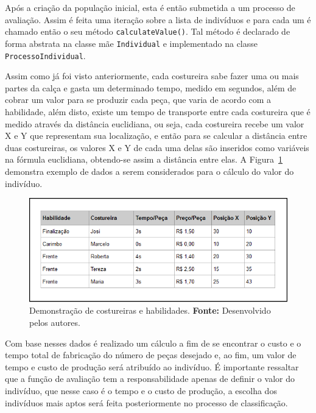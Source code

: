 \par Após a criação da população inicial, esta é então submetida a um processo
de avaliação. Assim é feita uma iteração sobre a lista de indivíduos e para cada um é chamado então o seu método 
\texttt{calculateValue()}. Tal método é declarado de forma abstrata na classe mãe
\texttt{Individual} e implementado na classe \texttt{ProcessoIndividual}.

\par Assim como já foi visto anteriormente, cada costureira sabe fazer uma ou
mais partes da calça e gasta um determinado tempo, medido em segundos, além de cobrar um valor 
para se produzir cada peça, que varia de  acordo com a habilidade, além disto, existe um 
tempo de transporte entre cada costureira que é medido através da distância euclidiana, 
ou seja, cada costureira recebe um valor X e Y que representam sua localização, e então 
para se calcular a distância entre duas costureiras, os valores X e Y de cada uma delas
são inseridos como variáveis na fórmula euclidiana, obtendo-se assim
a distância entre elas. A Figura~\ref{fig:demonstracao_costureiras_habilidades} demonstra 
exemplo de dados a serem considerados para o cálculo do valor do indivíduo.


\begin{figure}[h!]
	\centerline{\includegraphics[scale=0.5]{./imagens/tempo_habilidade_3.PNG}}
	\caption[Demonstração de costureiras e habilidades.]
	{Demonstração de costureiras e habilidades. \textbf{Fonte:} Desenvolvido pelos
	autores.}
	\label{fig:demonstracao_costureiras_habilidades}
\end{figure}

\par Com base nesses dados é realizado um cálculo a fim de se encontrar o custo e o tempo total de fabricação do número de peças
desejado e, ao fim, um valor de tempo e custo de produção será atribuído ao indivíduo. É importante ressaltar que a função de avaliação tem a responsabilidade apenas de definir o valor do indivíduo, que nesse caso é o tempo e o custo de produção, a escolha dos indivíduos mais aptos será feita posteriormente no processo de classificação.

